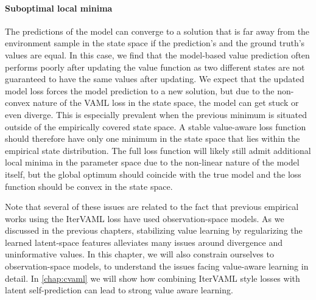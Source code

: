 \paragraph{Suboptimal local minima} %
The predictions of the model can converge to a solution that is far away from the environment sample in the state space if the prediction's and the ground truth's values are equal.
In this case, we find that the model-based value prediction often performs poorly after updating the value function as two different states are not guaranteed to have the same values after updating.
We expect that the updated model loss forces the model prediction to a new solution, but due to the non-convex nature of the VAML loss in the state space, the model can get stuck or even diverge.
This is especially prevalent when the previous minimum is situated outside of the empirically covered state space.
A stable value-aware loss function should therefore have only one minimum in the state space that lies within the empirical state distribution. 
The full loss function will likely still admit additional local minima in the parameter space due to the non-linear nature of the model itself, but the global optimum should coincide with the true model and the loss function should be convex in the state space.

Note that several of these issues are related to the fact that previous empirical works using the IterVAML loss have used observation-space models.
As we discussed in the previous chapters, stabilizing value learning by regularizing the learned latent-space features alleviates many issues around divergence and uninformative values.
In this chapter, we will also constrain ourselves to observation-space models, to understand the issues facing value-aware learning in detail.
In \autoref{chap:cvaml} we will show how combining IterVAML style losses with latent self-prediction can lead to strong value aware learning.

